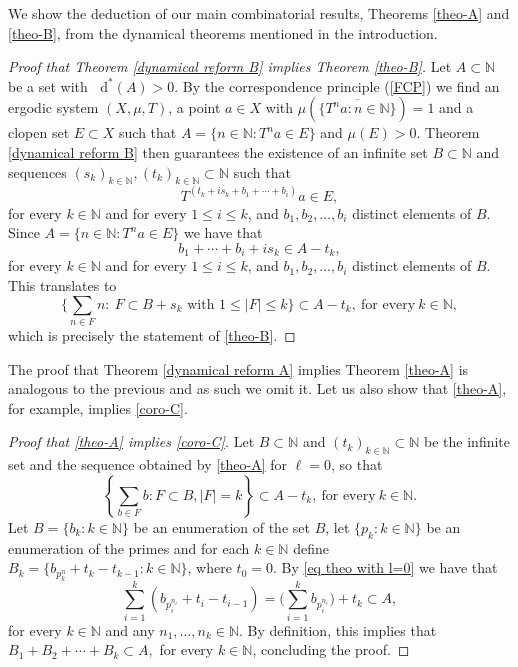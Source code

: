 \documentclass[letter, 11pt]{article}
\theoremstyle{definition}
\theoremstyle{plain}
\newcommand{\N}{\mathbb{N}}
\newcommand*\diff{\mathop{}\!\mathrm{d}}
\newcommand{\1}{\mathbbm{1}}
\begin{document}
We show the deduction of our main combinatorial results, Theorems 
\ref{theo-A} and \ref{theo-B}, from the dynamical theorems mentioned in the introduction.

\begin{proof}[Proof that Theorem \ref{dynamical reform B} implies Theorem \ref{theo-B}]
Let $A\subset\N$ be a set with $\diff^*(A)>0$. By the correspondence principle (\cref{FCP}) we find an ergodic system $(X,\mu,T)$, a point $a\in X$ with 
$\mu\left(\overline{\{T^na: n\in \N\}}\right)=1$ and a clopen set 
$E\subset X$ such that $A=\{n\in \N: T^na\in E\}$ and $\mu(E)>0$. Theorem \ref{dynamical reform B} then guarantees the existence of an infinite set $B\subset \N$ and sequences $(s_k)_{k\in \N}, (t_k)_{k\in \N}\subset \N$ such that 
$$T^{\left(t_k+i s_k + b_1+\cdots + b_i \right)}a \in E,$$
for every $k\in \N$ and for every $1\leq i \leq k$, and $b_1,b_2,\ldots,b_i$ distinct elements of $B$. Since $A=\{n\in \N: T^na\in E\}$ we have that 
$$b_1+\cdots + b_i+is_k \in A-t_k,$$
for every $k\in \N$ and for every $1\leq i \leq k$, and $b_1,b_2,\ldots,b_i$ distinct elements of $B$. This translates to 
 $$ \bigg\{ \sum_{n\in F} n \colon \ F\subset B+s_k \text{ with } 1\leq |F|\leq k \bigg\} \subset A-t_k ,\ \text{for every}\ k\in \N,$$
which is precisely the statement of \cref{theo-B}.
\end{proof}

The proof that Theorem \ref{dynamical reform A} implies Theorem 
\ref{theo-A} is analogous to the previous and as such we omit it. 
Let us also show that \cref{theo-A}, for example, implies 
\cref{coro-C}. 

\begin{proof}[Proof that \cref{theo-A} implies \cref{coro-C}]
    Let $B \subset \N$ and $(t_k)_{k\in \N}\subset \N$ be the infinite set and the sequence obtained by \cref{theo-A} for $\ell=0$, so that 
    \begin{equation} \label{eq theo with l=0}
        \left \{\sum_{b \in F} b : F \subset B, |F| =k \right\}\subset A-t_k,\ \text{for every}\ k\in \N.
    \end{equation}
    Let $B=\{b_k:k\in \N\}$ be an enumeration of the set $B$, let $\{p_k: k\in \N\}$ be an enumeration of the primes and for each $k\in \N$ define $B_k= \{b_{p_k^n} + t_{k}-t_{k-1} \colon k \in \N\}$, where $t_0=0$. By \eqref{eq theo with l=0} we have that
    \begin{equation*}
        \sum_{i=1}^k (b_{p_i^{n_i}} + t_{i}-t_{i-1}) = \Big( \sum_{i=1}^k b_{p_i^{n_i}}  \Big) + t_k \subset A,
    \end{equation*}
    for every $k\in \N$ and any $n_1,\ldots,n_k\in \N$. By definition, this implies that $B_1 + B_2 + \cdots + B_k\subset A,$ for every $k\in \N$, concluding the proof.
\end{proof}
\end{document}
